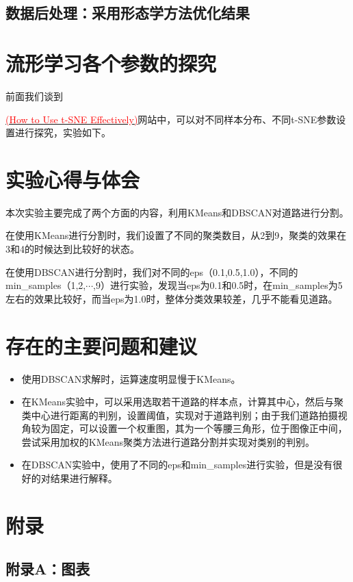 \documentclass[12pt,hyperref,a4paper,UTF8]{ctexart}
\begin{document}
{\subsection{数据后处理：采用形态学方法优化结果}



\section{流形学习各个参数的探究}
前面我们谈到{\href{https://distill.pub/2016/misread-tsne}{\textcolor{red}{(How to Use t-SNE Effectively)}}网站中，可以对不同样本分布、不同t-SNE参数设置进行探究，实验如下。
	

\section{实验心得与体会}
本次实验主要完成了两个方面的内容，利用KMeans和DBSCAN对道路进行分割。

在使用KMeans进行分割时，我们设置了不同的聚类数目，从2到9，聚类的效果在3和4的时候达到比较好的状态。

在使用DBSCAN进行分割时，我们对不同的eps（0.1,0.5,1.0），不同的min\_samples（1,2,$\cdots$,9）进行实验，发现当eps为0.1和0.5时，在min\_samples为5左右的效果比较好，而当eps为1.0时，整体分类效果较差，几乎不能看见道路。


\section{存在的主要问题和建议}

\begin{itemize}
    \item 使用DBSCAN求解时，运算速度明显慢于KMeans。
    \item 在KMeans实验中，可以采用选取若干道路的样本点，计算其中心，然后与聚类中心进行距离的判别，设置阈值，实现对于道路判别；由于我们道路拍摄视角较为固定，可以设置一个权重图，其为一个等腰三角形，位于图像正中间，尝试采用加权的KMeans聚类方法进行道路分割并实现对类别的判别。
    \item 在DBSCAN实验中，使用了不同的eps和min\_samples进行实验，但是没有很好的对结果进行解释。
\end{itemize}


\section{附录}
\subsection*{附录A：图表}


}}
\end{document}

